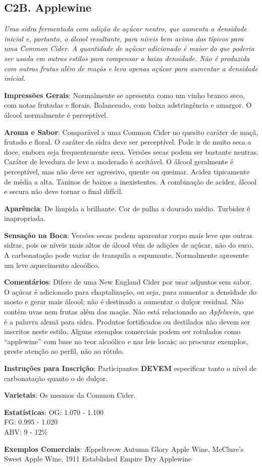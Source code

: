 \subsection*{C2B. Applewine}

\textit{Uma sidra fermentada com adição de açúcar neutro, que aumenta a densidade inicial e, portanto, o álcool resultante, para níveis bem acima dos típicos para uma Common Cider. A quantidade de açúcar adicionado é maior do que poderia ser usada em outros estilos para compensar a baixa densidade. Não é produzida com outras frutas além de maçãs e leva apenas açúcar para aumentar a densidade inicial.}

\textbf{Impressões Gerais}: Normalmente se apresenta como um vinho branco seco, com notas frutadas e florais. Balanceado, com baixa adstringência e amargor. O álcool normalmente é perceptível.

\textbf{Aroma e Sabor}: Comparável a uma Common Cider no quesito caráter de maçã, frutado e floral. O caráter de sidra deve ser perceptível. Pode ir de muito seca a doce, embora seja frequentemente seca. Versões secas podem ser bastante neutras. Caráter de levedura de leve a moderado é aceitável. O álcool geralmente é perceptível, mas não deve ser agressivo, quente ou queimar. Acidez tipicamente de média a alta. Taninos de baixos a inexistentes. A combinação de acidez, álcool e secura não deve tornar o final difícil.

\textbf{Aparência}: De límpida a brilhante. Cor de palha a dourado médio. Turbidez é inapropriada.

\textbf{Sensação na Boca}: Versões secas podem aparentar corpo mais leve que outras sidras, pois os níveis mais altos de álcool vêm de adições de açúcar, não do suco. A carbonatação pode variar de tranquila a espumante. Normalmente apresente um leve aquecimento alcoólico.

\textbf{Comentários}: Difere de uma New England Cider por usar adjuntos sem sabor. O açúcar é adicionado para chaptalização, ou seja, para aumentar a densidade do mosto e gerar mais álcool; não é destinado a aumentar o dulçor residual. Não contém uvas nem frutas além das maçãs. Não está relacionado ao \textit{Apfelwein}, que é a palavra alemã para sidra. Produtos fortificados ou destilados não devem ser inscritos neste estilo. Alguns exemplos comerciais podem ser rotulados como “applewine” com base no teor alcoólico e nas leis locais; ao procurar exemplos, preste atenção ao perfil, não ao rótulo.

\textbf{Instruções para Inscrição}: Participantes \textbf{DEVEM} especificar tanto o nível de carbonatação quanto o de dulçor.

\textbf{Varietais}: Os mesmos da Common Cider.

\textbf{Estatísticas}: OG: 1.070 - 1.100 \\
\phantom{ } \hspace{16.5mm} FG: 0.995 - 1.020 \\
\phantom{ } \hspace{16.5mm} ABV: 9 - 12\%

\textbf{Exemplos Comerciais}: Æppeltreow Autumn Glory Apple Wine, McClure’s Sweet Apple Wine, 1911 Established Empire Dry Applewine
